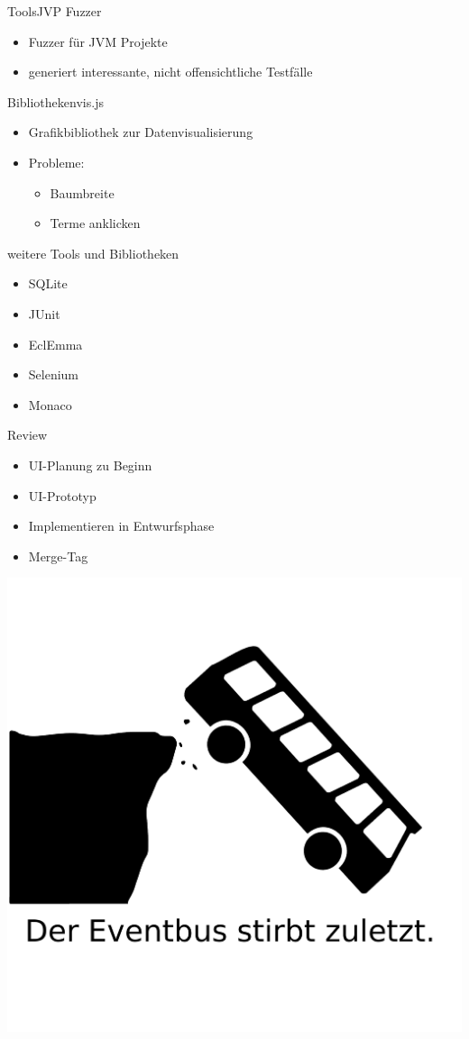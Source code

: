 \documentclass[10pt]{beamer}
\begin{document}
\begin{frame}{Tools}{JVP Fuzzer}
	\begin{itemize}
		\item Fuzzer für JVM Projekte
		\item generiert interessante, nicht offensichtliche Testfälle
	\end{itemize}
\end{frame}

\begin{frame}{Bibliotheken}{vis.js}
	\begin{itemize}
		\item Grafikbibliothek zur Datenvisualisierung
		\item Probleme: 
			\begin{itemize}
				\item{Baumbreite}
				\item{Terme anklicken}
			\end{itemize}
	\end{itemize}
\end{frame}

\begin{frame}{weitere Tools und Bibliotheken}{}
	\begin{itemize}
		\item SQLite
		\item JUnit
		\item EclEmma
		\item Selenium
		\item Monaco
	\end{itemize}
\end{frame}


\begin{frame}{Review}{}
	\begin{itemize}
		\item UI-Planung zu Beginn
		\item UI-Prototyp
		\item Implementieren in Entwurfsphase
		\item Merge-Tag
	\end{itemize}
\end{frame}

{\1
\begin{frame}
  \includegraphics[width = \textwidth]{img/eventbus}
\end{frame}}
\end{document}

